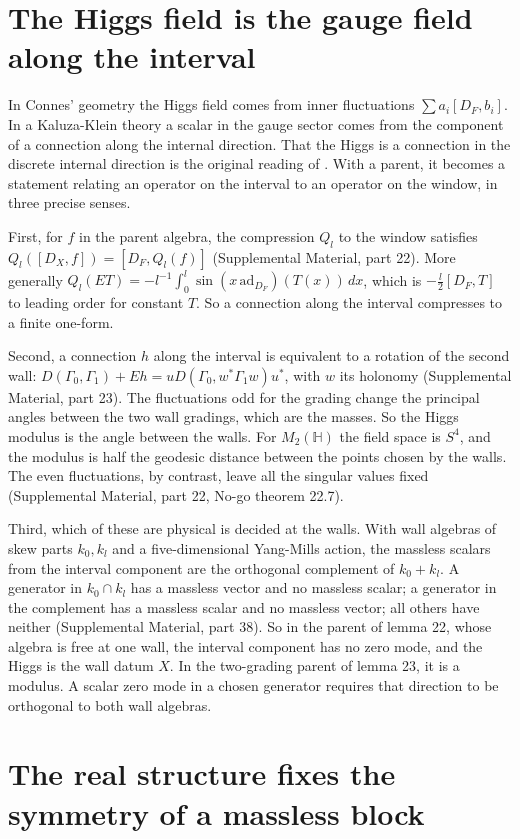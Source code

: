 \documentclass[aps,prd,reprint,onecolumn,nofootinbib,amsmath,amssymb,floatfix]{revtex4-2}
\theoremstyle{plain}
\renewcommand{\H}{\mathbb H}
\newcommand{\supp}[1]{Supplemental Material, part #1}
\begin{document}
\section{The Higgs field is the gauge field along the interval}

In Connes' geometry the Higgs field comes from inner fluctuations $\sum a_i[D_F,b_i]$. In a Kaluza-Klein theory a scalar in the gauge sector comes from the component of a connection along the internal direction. That the Higgs is a connection in the discrete internal direction is the original reading of \cite{ConnesLott1991}. With a parent, it becomes a statement relating an operator on the interval to an operator on the window, in three precise senses.

First, for $f$ in the parent algebra, the compression $Q_l$ to the window satisfies $Q_l([D_X,f])=[D_F,Q_l(f)]$ (\supp{22}). More generally $Q_l(ET)=-l^{-1}\int_0^l\sin(x\,\mathrm{ad}_{D_F})(T(x))\,dx$, which is $-\tfrac l2[D_F,T]$ to leading order for constant $T$. So a connection along the interval compresses to a finite one-form.

Second, a connection $h$ along the interval is equivalent to a rotation of the second wall: $D(\Gamma_0,\Gamma_1)+Eh=uD(\Gamma_0,w^*\Gamma_1w)u^*$, with $w$ its holonomy (\supp{23}). The fluctuations odd for the grading change the principal angles between the two wall gradings, which are the masses. So the Higgs modulus is the angle between the walls. For $M_2(\H)$ the field space is $S^4$, and the modulus is half the geodesic distance between the points chosen by the walls. The even fluctuations, by contrast, leave all the singular values fixed (\supp{22}, No-go theorem 22.7).

Third, which of these are physical is decided at the walls. With wall algebras of skew parts $k_0,k_l$ and a five-dimensional Yang-Mills action, the massless scalars from the interval component are the orthogonal complement of $k_0+k_l$. A generator in $k_0\cap k_l$ has a massless vector and no massless scalar; a generator in the complement has a massless scalar and no massless vector; all others have neither (\supp{38}). So in the parent of lemma 22, whose algebra is free at one wall, the interval component has no zero mode, and the Higgs is the wall datum $X$. In the two-grading parent of lemma 23, it is a modulus. A scalar zero mode in a chosen generator requires that direction to be orthogonal to both wall algebras.

\section{The real structure fixes the symmetry of a massless block}
\end{document}
